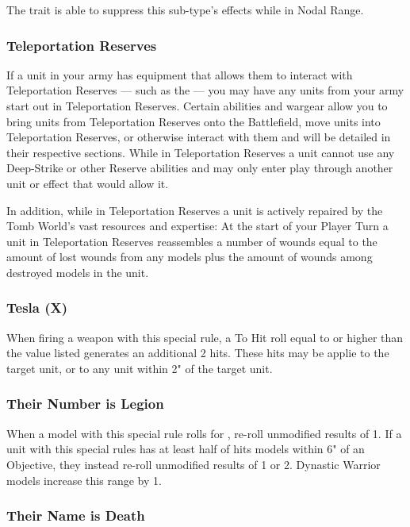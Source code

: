 \begin{multicols}{2}
The  trait is able to suppress this sub-type's effects while in Nodal Range.


\subsubsection{Teleportation Reserves} \label{Teleportation Reserves}

If a unit in your army has equipment that allows them to interact with Teleportation Reserves — such as the  — you may have any units from your army start out in Teleportation Reserves. Certain abilities and wargear allow you to bring units from Teleportation Reserves onto the Battlefield, move units into Teleportation Reserves, or otherwise interact with them and will be detailed in their respective sections. While in Teleportation Reserves a unit cannot use any Deep-Strike or other Reserve abilities and may only enter play through another unit or effect that would allow it.

In addition, while in Teleportation Reserves a unit is actively repaired by the Tomb World's vast resources and expertise: At the start of your Player Turn a unit in Teleportation Reserves reassembles a number of wounds equal to the amount of lost wounds from any models plus the amount of wounds among destroyed models in the unit.

\subsubsection{Tesla (X)} \label{Tesla}

When firing a weapon with this special rule, a To Hit roll equal to or higher than the value listed generates an additional 2 hits. These hits may be applie to the target unit, or to any unit within 2" of the target unit.

\subsubsection{Their Number is Legion} \label{Their Number is Legion}

When a model with this special rule rolls for , re-roll unmodified results of 1. If a unit with this special rules has at least half of hits models within 6" of an Objective, they instead re-roll unmodified results of 1 or 2. Dynastic Warrior models increase this range by 1.

\subsubsection{Their Name is Death} \label{Their Name is Death}


\end{multicols}
